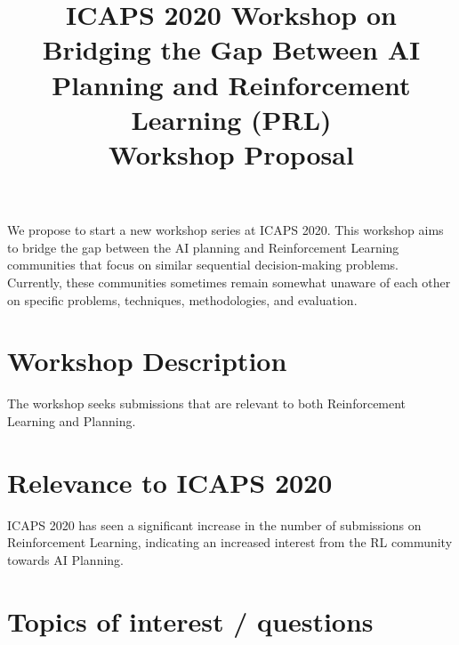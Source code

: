 \documentclass[10pt]{article}
\begin{document}
\title{ICAPS 2020 Workshop on \\ Bridging the Gap Between AI Planning and Reinforcement Learning (PRL)\\ \vspace*{0.7cm} Workshop Proposal
}
\date{}

\author{}

\maketitle


We propose to start a new workshop series at ICAPS 2020. This workshop aims to
bridge the gap between the AI planning and Reinforcement Learning communities
that focus on similar sequential decision-making problems. Currently, these
communities sometimes remain somewhat unaware of each other on specific
problems, techniques, methodologies, and evaluation.

\section*{Workshop Description}

The workshop seeks submissions that are relevant to both Reinforcement Learning
and Planning. 






\section*{Relevance to ICAPS 2020}
ICAPS 2020 has seen a significant increase in the number of submissions on
Reinforcement Learning, indicating an increased interest from the RL community
towards AI Planning.

\section*{Topics of interest / questions}
\end{document}
